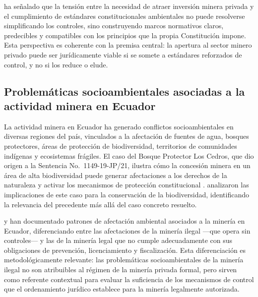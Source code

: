 \textcite{grefa_valencia_2021} ha señalado que la tensión entre la necesidad de atraer inversión minera privada y el cumplimiento de estándares constitucionales ambientales no puede resolverse simplificando los controles, sino construyendo marcos normativos claros, predecibles y compatibles con los principios que la propia Constitución impone. Esta perspectiva es coherente con la premisa central: la apertura al sector minero privado puede ser jurídicamente viable si se somete a estándares reforzados de control, y no si los reduce o elude.

\subsection{Problemáticas socioambientales asociadas a la actividad minera en Ecuador}

La actividad minera en Ecuador ha generado conflictos socioambientales en diversas regiones del país, vinculados a la afectación de fuentes de agua, bosques protectores, áreas de protección de biodiversidad, territorios de comunidades indígenas y ecosistemas frágiles. El caso del Bosque Protector Los Cedros, que dio origen a la Sentencia No.\ 1149-19-JP/21, ilustra cómo la concesión minera en un área de alta biodiversidad puede generar afectaciones a los derechos de la naturaleza y activar los mecanismos de protección constitucional \parencite{cce_1149_19_jp_21}. \textcite{peck_et_al_2024} analizaron las implicaciones de este caso para la conservación de la biodiversidad, identificando la relevancia del precedente más allá del caso concreto resuelto.

\textcite{sanchez_romero_et_al_2026} y \textcite{condoy_viera_2025} han documentado patrones de afectación ambiental asociados a la minería en Ecuador, diferenciando entre las afectaciones de la minería ilegal ---que opera sin controles--- y las de la minería legal que no cumple adecuadamente con sus obligaciones de prevención, licenciamiento y fiscalización. Esta diferenciación es metodológicamente relevante: las problemáticas socioambientales de la minería ilegal no son atribuibles al régimen de la minería privada formal, pero sirven como referente contextual para evaluar la suficiencia de los mecanismos de control que el ordenamiento jurídico establece para la minería legalmente autorizada.

